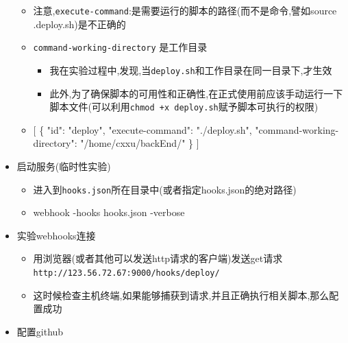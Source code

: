 \documentclass[
]{article}
\newenvironment{Shaded}{}{}
\newcommand{\DataTypeTok}[1]{\textcolor[rgb]{0.56,0.13,0.00}{#1}}
\newcommand{\FunctionTok}[1]{\textcolor[rgb]{0.02,0.16,0.49}{#1}}
\newcommand{\NormalTok}[1]{#1}
\newcommand{\OtherTok}[1]{\textcolor[rgb]{0.00,0.44,0.13}{#1}}
\newcommand{\StringTok}[1]{\textcolor[rgb]{0.25,0.44,0.63}{#1}}
\begin{document}
\begin{itemize}
  \begin{itemize}
  \item
    注意,\texttt{execute-command}:是需要运行的脚本的路径(而不是命令,譬如source
    .deploy.sh)是不正确的
  \item
    \texttt{command-working-directory} 是工作目录

    \begin{itemize}
    \item
      我在实验过程中,发现,当\texttt{deploy.sh}和工作目录在同一目录下,才生效
    \item
      此外,为了确保脚本的可用性和正确性,在正式使用前应该手动运行一下脚本文件(可以利用\texttt{chmod\ +x\ deploy.sh}赋予脚本可执行的权限)
    \end{itemize}
  \item
\begin{Shaded}
\begin{Highlighting}[]

\OtherTok{[}
  \FunctionTok{\{}
    \DataTypeTok{"id"}\FunctionTok{:} \StringTok{"deploy"}\FunctionTok{,}
    \DataTypeTok{"execute{-}command"}\FunctionTok{:} \StringTok{"./deploy.sh"}\FunctionTok{,}
    \DataTypeTok{"command{-}working{-}directory"}\FunctionTok{:} \StringTok{"/home/cxxu/backEnd/"}
  \FunctionTok{\}}
\OtherTok{]}
\end{Highlighting}
\end{Shaded}
  \end{itemize}
\item
  启动服务(临时性实验)

  \begin{itemize}
  \item
    进入到\texttt{hooks.json}所在目录中(或者指定hooks.json的绝对路径)
  \item
\begin{Shaded}
\begin{Highlighting}[]
\NormalTok{webhook {-}hooks hooks.json {-}verbose}
\end{Highlighting}
\end{Shaded}
  \end{itemize}
\item
  实验webhooks连接

  \begin{itemize}
  \item
    用浏览器(或者其他可以发送http请求的客户端)发送get请求\texttt{http://123.56.72.67:9000/hooks/deploy/}
  \item
    这时候检查主机终端,如果能够捕获到请求,并且正确执行相关脚本,那么配置成功
  \end{itemize}
\item
  配置github


\end{itemize}
\end{document}
